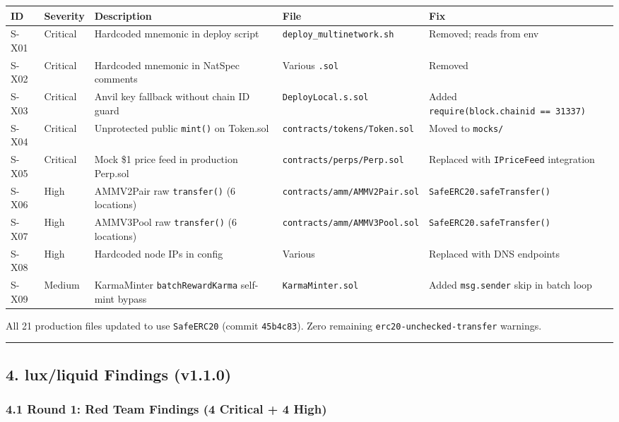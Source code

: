 \documentclass[
]{article}
\newcounter{none} %
\begin{document}
{\def\LTcaptype{none} %
\begin{longtable}[]{@{}lllll@{}}
\toprule\noalign{}
ID & Severity & Description & File & Fix \\
\midrule\noalign{}
\endhead
\bottomrule\noalign{}
\endlastfoot
S-X01 & Critical & Hardcoded mnemonic in deploy script &
\texttt{deploy\_multinetwork.sh} & Removed; reads from env \\
S-X02 & Critical & Hardcoded mnemonic in NatSpec comments & Various
\texttt{.sol} & Removed \\
S-X03 & Critical & Anvil key fallback without chain ID guard &
\texttt{DeployLocal.s.sol} & Added
\texttt{require(block.chainid\ ==\ 31337)} \\
S-X04 & Critical & Unprotected public \texttt{mint()} on Token.sol &
\texttt{contracts/tokens/Token.sol} & Moved to \texttt{mocks/} \\
S-X05 & Critical & Mock \$1 price feed in production Perp.sol &
\texttt{contracts/perps/Perp.sol} & Replaced with \texttt{IPriceFeed}
integration \\
S-X06 & High & AMMV2Pair raw \texttt{transfer()} (6 locations) &
\texttt{contracts/amm/AMMV2Pair.sol} &
\texttt{SafeERC20.safeTransfer()} \\
S-X07 & High & AMMV3Pool raw \texttt{transfer()} (6 locations) &
\texttt{contracts/amm/AMMV3Pool.sol} &
\texttt{SafeERC20.safeTransfer()} \\
S-X08 & High & Hardcoded node IPs in config & Various & Replaced with
DNS endpoints \\
S-X09 & Medium & KarmaMinter \texttt{batchRewardKarma} self-mint bypass
& \texttt{KarmaMinter.sol} & Added \texttt{msg.sender} skip in batch
loop \\
\end{longtable}
}

All 21 production files updated to use \texttt{SafeERC20} (commit
\texttt{45b4c83}). Zero remaining \texttt{erc20-unchecked-transfer}
warnings.

\begin{center}\rule{0.5\linewidth}{0.5pt}\end{center}

\subsection{4. lux/liquid Findings
(v1.1.0)}\label{4-luxliquid-findings-v110}

\subsubsection{4.1 Round 1: Red Team Findings (4 Critical + 4
High)}\label{41-round-1-red-team-findings-4-critical--4-high}
\end{document}
